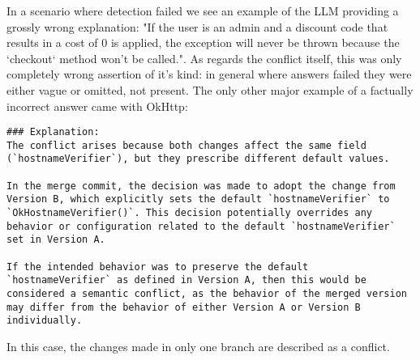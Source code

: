 In a scenario where detection failed we see an example of the LLM providing a grossly wrong explanation: "If the user is an admin and a discount code that results in a cost of 0 is applied, the exception will never be thrown because the `checkout` method won't be called.". As regards the conflict itself, this was only completely wrong assertion of it's kind: in general where answers failed they were either vague or omitted, not present. The only other major example of a factually incorrect answer came with OkHttp:
\begin{lstlisting}
### Explanation:
The conflict arises because both changes affect the same field (`hostnameVerifier`), but they prescribe different default values.
    
In the merge commit, the decision was made to adopt the change from Version B, which explicitly sets the default `hostnameVerifier` to `OkHostnameVerifier()`. This decision potentially overrides any behavior or configuration related to the default `hostnameVerifier` set in Version A.
    
If the intended behavior was to preserve the default `hostnameVerifier` as defined in Version A, then this would be considered a semantic conflict, as the behavior of the merged version may differ from the behavior of either Version A or Version B individually.
\end{lstlisting}
In this case, the changes made in only one branch are described as a conflict.

